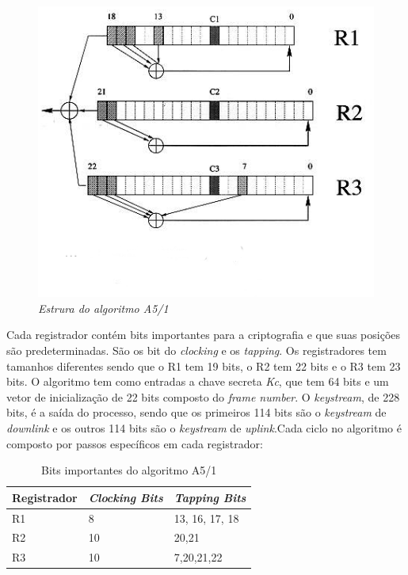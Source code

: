 \begin{figure}[h]
\centering
\includegraphics[keepaspectratio=true,scale=0.7]
    {figuras/a5_1.eps}
    \caption[\textit{Estrura do algoritmo A5/1}]{\textit{Estrura do algoritmo A5/1}\protect\footnotemark} 
\end{figure}

Cada registrador contém bits importantes para a criptografia e que suas posições são predeterminadas. São os bit do \textit{clocking} e os \textit{tapping}. Os registradores tem tamanhos diferentes sendo que o R1 tem 19 bits, o R2 tem 22 bits e o R3 tem 23 bits. O algoritmo tem como entradas a chave secreta \textit{Kc}, que tem 64 bits e um vetor de inicialização de 22 bits composto do \textit{frame number}. O \textit{keystream}, de 228 bits, é a saída do processo, sendo que os primeiros 114 bits são o \textit{keystream} de \textit{downlink} e os outros 114 bits são o \textit{keystream} de \textit{uplink}.Cada ciclo no algoritmo é composto por passos específicos em cada registrador:

\begin{table}[h]
\centering
	\begin{tabular}{|l|l|l|}
		\hline
		Registrador & \textit{Clocking Bits} & \textit{Tapping Bits} \\ \hline
		R1 & 8 & 13, 16, 17, 18 \\ \hline
		R2 & 10 & 20,21 \\ \hline
		R3 & 10 & 7,20,21,22 \\ \hline	
	\end{tabular}
	\caption{Bits importantes do algoritmo A5/1}
\end{table}

